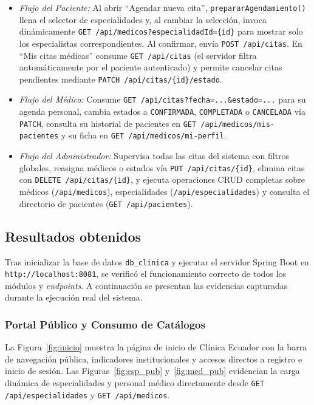 \documentclass{article}
\begin{document}
\begin{enumerate}
\begin{itemize}
        \item \textit{Flujo del Paciente:} Al abrir ``Agendar nueva cita'', \texttt{prepararAgendamiento()} llena el selector de especialidades y, al cambiar la selección, invoca dinámicamente \texttt{GET /api/medicos?especialidadId=\{id\}} para mostrar solo los especialistas correspondientes. Al confirmar, envía \texttt{POST /api/citas}. En ``Mis citas médicas'' consume \texttt{GET /api/citas} (el servidor filtra automáticamente por el paciente autenticado) y permite cancelar citas pendientes mediante \texttt{PATCH /api/citas/\{id\}/estado}.
        \item \textit{Flujo del Médico:} Consume \texttt{GET /api/citas?fecha=...\&estado=...} para su agenda personal, cambia estados a \texttt{CONFIRMADA}, \texttt{COMPLETADA} o \texttt{CANCELADA} vía \texttt{PATCH}, consulta su historial de pacientes en \texttt{GET /api/medicos/mis-pacientes} y su ficha en \texttt{GET /api/medicos/mi-perfil}.
        \item \textit{Flujo del Administrador:} Supervisa todas las citas del sistema con filtros globales, reasigna médicos o estados vía \texttt{PUT /api/citas/\{id\}}, elimina citas con \texttt{DELETE /api/citas/\{id\}}, y ejecuta operaciones CRUD completas sobre médicos (\texttt{/api/medicos}), especialidades (\texttt{/api/especialidades}) y consulta el directorio de pacientes (\texttt{GET /api/pacientes}).
    \end{itemize}
\end{enumerate}


\subsection{Resultados obtenidos}
Tras inicializar la base de datos \texttt{db\_clinica} y ejecutar el servidor Spring Boot en \texttt{http://localhost:8081}, se verificó el funcionamiento correcto de todos los módulos y \textit{endpoints}. A continuación se presentan las evidencias capturadas durante la ejecución real del sistema.

\subsubsection{Portal Público y Consumo de Catálogos}
La Figura~\ref{fig:inicio} muestra la página de inicio de Clínica Ecuador con la barra de navegación pública, indicadores institucionales y accesos directos a registro e inicio de sesión. Las Figuras~\ref{fig:esp_pub} y~\ref{fig:med_pub} evidencian la carga dinámica de especialidades y personal médico directamente desde \texttt{GET /api/especialidades} y \texttt{GET /api/medicos}.
\end{document}
